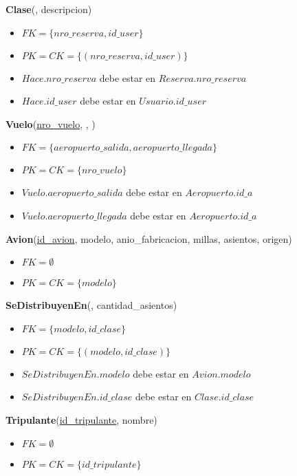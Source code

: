 \vspace*{0.1cm}
\noindent
\textbf{Clase}(\underline{}, descripcion)
\begin{itemize}[noitemsep]
	\item $FK = \{nro\_reserva, id\_user\}$
	\item $PK = CK = \{(nro\_reserva, id\_user)\}$
	\item $Hace.nro\_reserva$ debe estar en $Reserva.nro\_reserva$
	\item $Hace.id\_user$ debe estar en $Usuario.id\_user$
\end{itemize}


\newpage
\vspace*{0.1cm}
\noindent
\textbf{Vuelo}(\underline{nro\_vuelo}, ,
		)
\begin{itemize}[noitemsep]
	\item $FK = \{aeropuerto\_salida, aeropuerto\_llegada\}$
	\item $PK = CK = \{nro\_vuelo\}$
	\item $Vuelo.aeropuerto\_salida$ debe estar en $Aeropuerto.id\_a$
	\item $Vuelo.aeropuerto\_llegada$ debe estar en $Aeropuerto.id\_a$
\end{itemize}

\vspace*{0.1cm}
\noindent
\textbf{Avion}(\underline{id\_avion}, modelo, anio\_fabricacion, 
    millas, asientos, origen)
\begin{itemize}[noitemsep]
	\item $FK = \emptyset$
	\item $PK = CK = \{modelo\}$
\end{itemize}

\vspace*{0.1cm}
\noindent
\textbf{SeDistribuyenEn}(\underline{},
	cantidad\_asientos)
\begin{itemize}[noitemsep]
	\item $FK = \{modelo, id\_clase\}$
	\item $PK = CK = \{(modelo, id\_clase)\}$
	\item $SeDistribuyenEn.modelo$ debe estar en $Avion.modelo$
	\item $SeDistribuyenEn.id\_clase$ debe estar en $Clase.id\_clase$
\end{itemize}

\vspace*{0.1cm}
\noindent
\textbf{Tripulante}(\underline{id\_tripulante}, nombre)
\begin{itemize}[noitemsep]
	\item $FK = \emptyset$
	\item $PK = CK = \{id\_tripulante\}$
\end{itemize}

